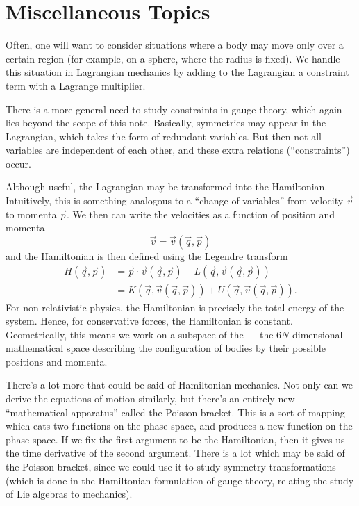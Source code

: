 \section{Miscellaneous Topics}

Often, one will want to consider situations where a body may move only
over a certain region (for example, on a sphere, where the radius is
fixed). We handle this situation in Lagrangian mechanics by adding to
the Lagrangian a constraint term with a Lagrange multiplier.

There is a more general need to study constraints in gauge theory, which
again lies beyond the scope of this note. Basically, symmetries may
appear in the Lagrangian, which takes the form of redundant
variables. But then not all variables are independent of each other, and
these extra relations (``constraints'') occur.

Although useful, the Lagrangian may be transformed into the
Hamiltonian. Intuitively, this is something analogous to a ``change of
variables'' from velocity $\vec{v}$ to momenta $\vec{p}$. We then can
write the velocities as a function of position and momenta
\begin{equation}
\vec{v} = \vec{v}(\vec{q},\vec{p})
\end{equation}
and the Hamiltonian is then defined using the Legendre transform
\begin{equation}
  \begin{split}
  H(\vec{q},\vec{p}) &= \vec{p}\cdot\vec{v}(\vec{q},\vec{p})
  - L(\vec{q}, \vec{v}(\vec{q},\vec{p}))\\
  &= K(\vec{q}, \vec{v}(\vec{q},\vec{p})) + U(\vec{q}, \vec{v}(\vec{q},\vec{p})).
  \end{split}
\end{equation}
For non-relativistic physics, the Hamiltonian is precisely the total
energy of the system. Hence, for conservative forces, the Hamiltonian is
constant. Geometrically, this means we work on a subspace of the
 --- the $6N$-dimensional mathematical space
describing the configuration of bodies by their possible positions and
momenta.

There's a lot more that could be said of Hamiltonian mechanics. Not only
can we derive the equations of motion similarly, but there's an entirely
new ``mathematical apparatus'' called the Poisson bracket. This is a
sort of mapping which eats two functions on the phase space, and
produces a new function on the phase space. If we fix the first argument
to be the Hamiltonian, then it gives us the time derivative of the
second argument. There is a lot which may be said of the Poisson
bracket, since we could use it to study symmetry transformations (which
is done in the Hamiltonian formulation of gauge theory, relating the
study of Lie algebras to mechanics).

